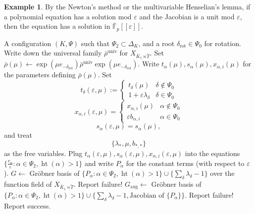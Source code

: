 \documentclass[11pt]{amsart}
\newcommand{\MINOREDITED}[1]{#1}
\theoremstyle{definition}
\newtheorem{example}[thm]{Example}
\newcommand{\rot}{{\operatorname{rot}}}
\newcommand{\bFp}{\bar{\mathbb{F}}_p}
\newcommand{\bT}{\breve{T}}
\newcommand{\univ}{{\operatorname{univ}}}
\DeclareMathOperator{\Ht}{ht}
\begin{document}
\begin{example}
By the Newton's method or the multivariable Henselian's lemma,
if a polynomial equation has a solution
mod $\varepsilon$
and the Jacobian is a unit mod $\varepsilon$,
then the equation has a solution
in $\bFp[\![\varepsilon]\!]$.
\end{example}



{
\begin{tcolorbox}
\begin{algorithmic}[1]
    \Require A configuration $(K,\Psi)$ 
such that $\Psi_2\subset \Delta_K$, and a root $\delta_{\rot}\in \Psi_0$
for rotation.
\State Write down the universal family
$\bar\rho^{\univ}$ for $X_{\bar K_1\rtimes \bT}$.
\State Set $\bar\rho(\mu)\gets
\exp(\mu e_{-\delta_\rot})\bar\rho^{\univ} \exp(\mu e_{-\delta_\rot})$.
\State
Write $t_{\alpha}(\mu), s_{\alpha}(\mu), x_{\alpha,i}(\mu)$
for the parameters defining $\bar\rho(\mu)$.
\State Set
\[
t_\delta(\varepsilon, \mu)
:= 
\begin{cases}
t_\delta(\mu) & \delta\not\in \Psi_0 \\
1+\varepsilon\lambda_\delta & \delta\in \Psi_0
\end{cases}
\]
\[
x_{\alpha, i}(\varepsilon, \mu) = 
\begin{cases}
x_{\alpha,i}(\mu) & \alpha\not\in \Psi_0
\\
\varepsilon b_{\alpha,i}
&\alpha\MINOREDITED{\in} \Psi_0
\end{cases}
\]
\[
s_{\alpha}(\varepsilon, \mu) = s_{\alpha}(\mu),
\]
and treat
\[
\{\lambda_*, \mu, b_{*,*}\}
\]
as the free variables.
\State Plug $t_\alpha(\varepsilon, \mu), s_\alpha(\varepsilon, \mu), x_{\alpha, i}(\varepsilon, \mu)$
\MINOREDITED{into} the equations
$\{\frac{r_\alpha}{\varepsilon}:\alpha\in \Psi_2, \Ht(\alpha)>1\}$
and write
$P_\alpha$ for the constant terms (with respect to $\varepsilon$).
\State $G\gets$ Gr\"obner basis of $\{P_\alpha:
\alpha\in \Psi_2, \Ht(\alpha)>1
\}\cup\{\sum_{\delta}\lambda_\delta-1\}$
over the function field of $X_{\bar K_1\rtimes \bT}$.
 
\State Report failure!
\EndIf
\State $G_{\text{aug}}\gets$ Gr\"obner basis of $\{P_\alpha:
\alpha\in \Psi_2, \Ht(\alpha)>1
\}\cup\{\sum_{\delta}\lambda_\delta-1,
\text{\MINOREDITED{Jacobian} of $\{P_\alpha\}$}\}$.
 
    \State Report failure!
\EndIf
\State Report success.
\end{algorithmic}
\end{tcolorbox}
\vspace{-5mm}
\renewcommand{\figurename}{Algorithm}
\label{box:rot}
}
\end{document}
